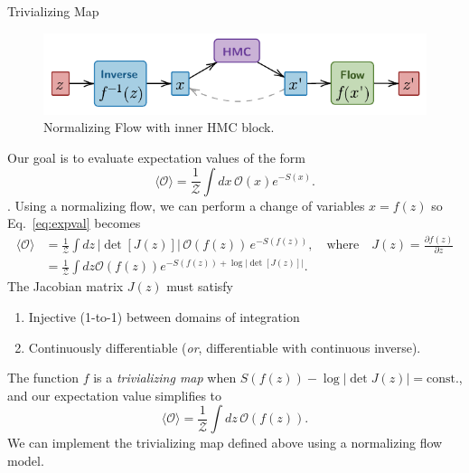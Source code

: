 \documentclass[final]{beamer}
\newlength{\colwidth}
\begin{document}
\begin{frame}[t]
\begin{columns}[t]
\begin{column}{\colwidth}
  \begin{block}{Trivializing Map}
    \begin{figure}
      \centering
      \includegraphics[width=\columnwidth]{assets/ftHMC}
      \caption{\label{fig:ftHMC}Normalizing Flow with inner HMC block.}
    \end{figure}
    Our goal is to evaluate expectation values of the form
    \begin{equation}
      \langle \mathcal{O}\rangle = \frac{1}{\mathcal{Z}}\int dx \,\mathcal{O}(x) e^{-S(x)}.
      \label{eq:expval}
    \end{equation}.
    Using a normalizing flow, we can perform a change of variables \(x = f(z)\) so Eq.~\ref{eq:expval} becomes 
    \begin{align}
      \langle \mathcal{O}\rangle 
        &= \frac{1}{\mathcal{Z}}\int dz\, |\det[J(z)]|\, \mathcal{O}(f(z))\,
        e^{-S(f(z))}, \quad\text{where}\quad J(z) = \frac{\partial f(z)}{\partial z} \\
        &= \frac{1}{\mathcal{Z}}\int dz \mathcal{O}(f(z)) e^{-S(f(z)) + \log|\det[J(z)]|}.
      \label{eq:expval_modified}
    \end{align}
    The Jacobian matrix \(J(z)\) must satisfy
    \begin{enumerate}
      \item Injective (1-to-1) between domains of integration
      \item Continuously differentiable (\emph{or}, differentiable with continuous inverse).
    \end{enumerate}
    The function \(f\) is a \emph{trivializing map} when \(S(f(z)) - \log|\det J(z)| = \text{const.}\), and our
    expectation value simplifies to 
    \begin{equation}
      \langle \mathcal{O}\rangle = \frac{1}{\mathcal{Z}}\int dz\, \mathcal{O}(f(z)).
    \end{equation}
    We can implement the trivializing map defined above using a normalizing flow model.

\end{block}
\end{column}
\end{columns}
\end{frame}
\end{document}
